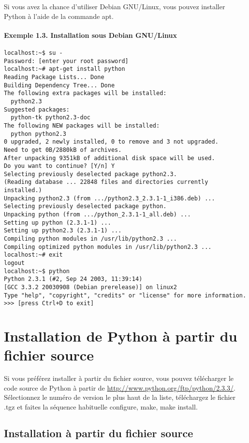Si vous avez la chance d'utiliser Debian GNU/Linux, vous pouvez installer Python à l'aide de la commande apt.

\paragraph*{Exemple 1.3. Installation sous Debian GNU/Linux}

\begin{lstlisting}
localhost:~$ su -
Password: [enter your root password]
localhost:~# apt-get install python
Reading Package Lists... Done
Building Dependency Tree... Done
The following extra packages will be installed:
  python2.3
Suggested packages:
  python-tk python2.3-doc
The following NEW packages will be installed:
  python python2.3
0 upgraded, 2 newly installed, 0 to remove and 3 not upgraded.
Need to get 0B/2880kB of archives.
After unpacking 9351kB of additional disk space will be used.
Do you want to continue? [Y/n] Y
Selecting previously deselected package python2.3.
(Reading database ... 22848 files and directories currently installed.)
Unpacking python2.3 (from .../python2.3_2.3.1-1_i386.deb) ...
Selecting previously deselected package python.
Unpacking python (from .../python_2.3.1-1_all.deb) ...
Setting up python (2.3.1-1) ...
Setting up python2.3 (2.3.1-1) ...
Compiling python modules in /usr/lib/python2.3 ...
Compiling optimized python modules in /usr/lib/python2.3 ...
localhost:~# exit
logout
localhost:~$ python
Python 2.3.1 (#2, Sep 24 2003, 11:39:14)
[GCC 3.3.2 20030908 (Debian prerelease)] on linux2
Type "help", "copyright", "credits" or "license" for more information.
>>> [press Ctrl+D to exit]
\end{lstlisting}

\section{Installation de Python à partir du fichier source}\label{Installation de Python à partir du fichier source}

Si vous préférez installer à partir du fichier source, vous pouvez télécharger le code source de Python à partir de \url{http://www.python.org/ftp/python/2.3.3/}. Sélectionnez le numéro de version le plus haut de la liste, téléchargez le fichier .tgz et faites la séquence habituelle configure, make, make install.

\subsection*{Installation à partir du fichier source}

